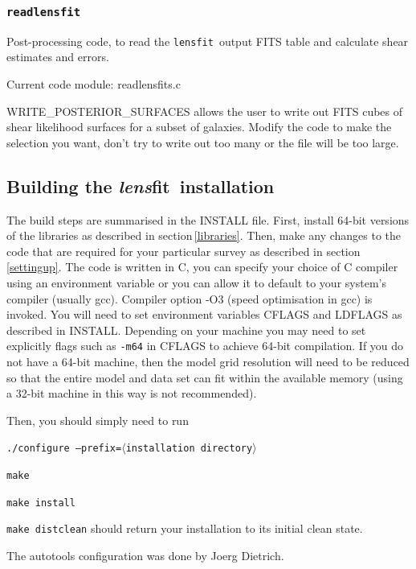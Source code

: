 \documentclass{article}
\def\lensfit{{\tt lensfit}\ }
\def\lensfitsuite{{\em lens}fit\ }
\def\readlensfit{{\tt readlensfit}\ }
\def\<{{$\langle$}}
\def\>{{$\rangle$}}
\begin{document}
\subsubsection{\readlensfit}
Post-processing code, to read the \lensfit output FITS table and calculate shear estimates and errors.

Current code module: readlensfits.c

\begin{list}{}{\itemsep=0mm \leftmargin=5mm}
\item WRITE\_POSTERIOR\_SURFACES allows the user to write out FITS cubes of shear likelihood
surfaces for a subset of galaxies.  Modify the code to make the selection you want, don't try to
write out too many or the file will be too large.
\end{list}

\subsection{Building the \lensfitsuite installation}
The build steps are summarised in the INSTALL file.  First, install 64-bit versions of the libraries as
described in section\,\ref{libraries}.  
Then, make any changes to the code that are required for your particular survey as described
in section\,\ref{settingup}.
The code is written in C, you can specify your choice of C compiler using an environment variable
or you can allow it to default to your system's compiler (usually gcc).
Compiler option -O3 (speed optimisation in gcc) is invoked. 
You will need to set environment variables CFLAGS and LDFLAGS as described in INSTALL.  
Depending on your machine you may 
need to set explicitly flags such as {\tt -m64} in CFLAGS to achieve 64-bit compilation. 
If you do not have a 64-bit 
machine, then the model grid resolution will need to be reduced so that the entire model and data set can 
fit within the available memory (using a 32-bit machine in this way is not recommended).

Then, you should simply
need to run 
\begin{list}{}{\itemsep=0mm \leftmargin=5mm}
\item {\tt ./configure --prefix=\<installation directory\>}
\item {\tt make} 
\item {\tt make install}
\end{list}
{\tt make distclean} should return your installation to its initial clean state.

The autotools configuration was done by Joerg Dietrich.
\end{document}

